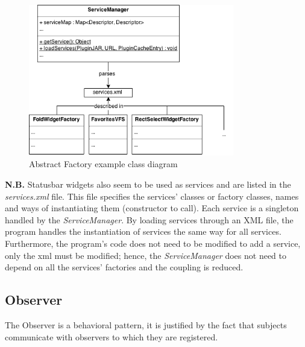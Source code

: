 \begin{figure}[h!]
    \includegraphics[width=0.8\textwidth]{images/abstractfactory.png}
    \centering
    \caption{Abstract Factory example class diagram}
\end{figure}

\begin{framehint2}
    \textbf{N.B.} Statusbar widgets also seem to be used as services and are
    listed in the \emph{services.xml} file. This file specifies the services'
    classes or factory classes, names and ways of instantiating them
    (constructor to call).
    Each service is a singleton handled by the \emph{ServiceManager}.
    By loading services through an XML file, the program handles the
    instantiation of services the same way for all services. Furthermore, the
    program's code does not need to be modified to add a service, only the
    xml must be modified; hence, the \emph{ServiceManager} does not need to
    depend on all the services' factories and the coupling is reduced.
\end{framehint2}
\newpage

\subsection{Observer}

The Observer is a behavioral pattern, it is justified by the fact that
subjects communicate with observers to which they are registered.\\

